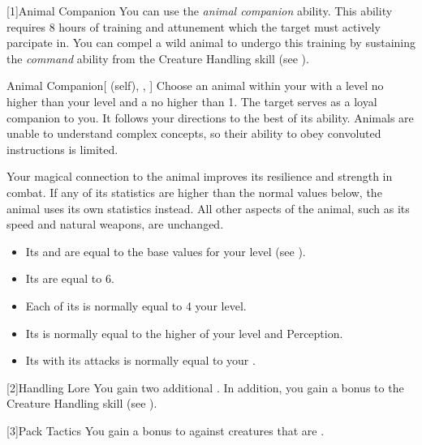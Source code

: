         [1]{Animal Companion}
        You can use the \textit{animal companion} ability.
        This ability requires 8 hours of training and attunement which the target must actively parcipate in.
        You can compel a wild animal to undergo this training by sustaining the \textit{command} ability from the Creature Handling skill (see ).
        \begin{attuneability}{Animal Companion}[ (self), , ]
            Choose an animal  within your  with a level no higher than your level and a  no higher than 1.
            The target serves as a loyal companion to you.
            It follows your directions to the best of its ability.
            Animals are unable to understand complex concepts, so their ability to obey convoluted instructions is limited.

            Your magical connection to the animal improves its resilience and strength in combat.
            If any of its statistics are higher than the normal values below, the animal uses its own statistics instead.
            All other aspects of the animal, such as its speed and natural weapons, are unchanged.
            \begin{itemize}
                \item Its  and  are equal to the base values for your level (see ).
                \item Its  are equal to 6.
                \item Each of its  is normally equal to 4 \add your level.
                \item Its  is normally equal to the higher of your level and Perception.
                \item Its  with its attacks is normally equal to your  .
            \end{itemize}
        \end{attuneability}

        [2]{Handling Lore} You gain two additional .
        In addition, you gain a  bonus to the Creature Handling skill (see ).

        [3]{Pack Tactics} You gain a  bonus to  against creatures that are .

